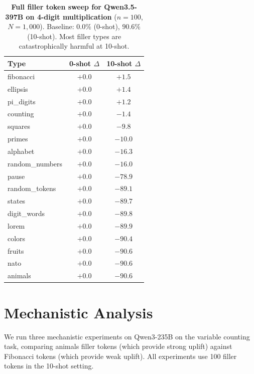 \documentclass{article}
\begin{document}
\begin{table}[t]
\centering
\caption{\textbf{Full filler token sweep for Qwen3.5-397B on 4-digit multiplication} ($n{=}100$, $N{=}1{,}000$). Baseline: $0.0\%$ (0-shot), $90.6\%$ (10-shot). Most filler types are catastrophically harmful at 10-shot.}
\label{tab:qwen35_sweep}
\small
{}
\begin{tabular}{@{}lcc@{}}
\toprule
\textbf{Type} & \textbf{0-shot $\Delta$} & \textbf{10-shot $\Delta$} \\
\midrule
fibonacci       & $+0.0$ & $+1.5$  \\
ellipsis        & $+0.0$ & $+1.4$  \\
pi\_digits      & $+0.0$ & $+1.2$  \\
counting        & $+0.0$ & $-1.4$  \\
squares         & $+0.0$ & $-9.8$  \\
primes          & $+0.0$ & $-10.0$ \\
alphabet        & $+0.0$ & $-16.3$ \\
random\_numbers & $+0.0$ & $-16.0$ \\
pause           & $+0.0$ & $-78.9$ \\
random\_tokens  & $+0.0$ & $-89.1$ \\
states          & $+0.0$ & $-89.7$ \\
digit\_words    & $+0.0$ & $-89.8$ \\
lorem           & $+0.0$ & $-89.9$ \\
colors          & $+0.0$ & $-90.4$ \\
fruits          & $+0.0$ & $-90.6$ \\
nato            & $+0.0$ & $-90.6$ \\
animals         & $+0.0$ & $-90.6$ \\
\bottomrule
\end{tabular}
\end{table}


\section{Mechanistic Analysis}
\label{app:mechinterp}

We run three mechanistic experiments on Qwen3-235B on the variable counting task, comparing animals filler tokens (which provide strong uplift) against Fibonacci tokens (which provide weak uplift). All experiments use 100 filler tokens in the 10-shot setting.
\end{document}
